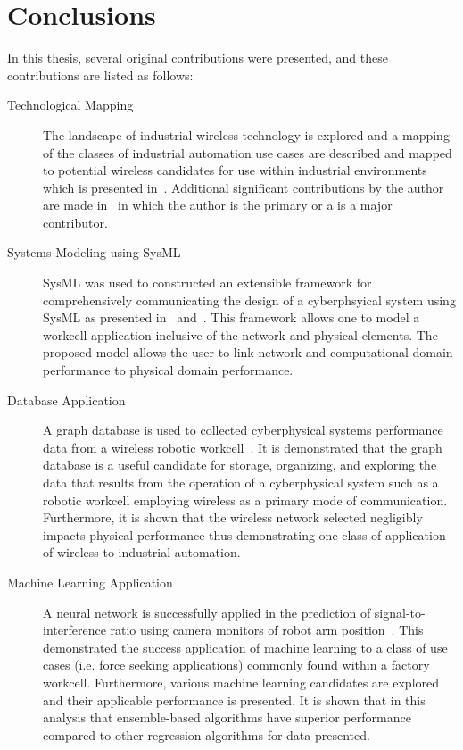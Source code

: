 
\chapter{Conclusions}

In this thesis, several original contributions were presented, and these contributions are listed as follows:

\begin{description}
	\item[Technological Mapping] The landscape of industrial wireless technology is explored and a mapping of the classes of industrial automation use cases are described and mapped to potential wireless candidates for use within industrial environments which is presented in~\cite{CandellRW2017}.  Additional significant contributions by the author are made in~\cite{Candell2018.IWSGuide, Candell2017.SAS.IWSWorkshopReport, Montgomery2019} in which the author is the primary or a is a major contributor.
	
	\item[Systems Modeling using SysML] SysML was used to constructed an extensible framework for comprehensively communicating the design of a cyberphsyical system using SysML as presented in~\cite{SysML.Candell2018} and~\cite{Candell2018SysML.DATA}.  This framework allows one to model a workcell application inclusive of the network and physical elements.  The proposed model allows the user to link network and computational domain performance to physical domain performance.
	
	\item[Database Application] A graph database is used to collected cyberphysical systems performance data from a wireless robotic workcell~\cite{CandellISIT2020.Conf}.  It is demonstrated that the graph database is a useful candidate for storage, organizing, and exploring the data that results from the operation of a cyberphysical system such as a robotic workcell employing wireless as a primary mode of communication.  Furthermore, it is shown that the wireless network selected negligibly impacts physical performance thus demonstrating one class of application of wireless to industrial automation.
	
	\item[Machine Learning Application] A neural network is successfully applied in the prediction of signal-to-interference ratio using camera monitors of robot arm position~\cite{CandellISIE2019.Conf, Candell2020.Jrnl.Access}.  This demonstrated the success application of machine learning to a class of use cases (i.e. force seeking applications) commonly found within a factory workcell.  Furthermore, various machine learning candidates are explored and their applicable performance is presented.  It is shown that in this analysis that ensemble-based algorithms have superior performance compared to other regression algorithms for data presented.  
\end{description}

